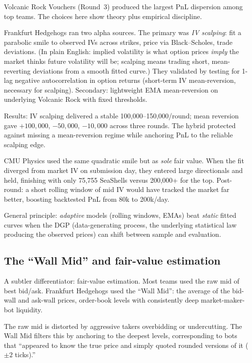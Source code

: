 Volcanic Rock Vouchers (Round~3) produced the largest PnL
dispersion among top teams.  The choices here show theory plus
empirical discipline.

Frankfurt Hedgehogs ran two alpha sources.  The primary was \emph{IV
scalping}: fit a parabolic smile to observed IVs across strikes,
price via Black--Scholes, trade deviations.  (In plain English:
implied volatility is what option prices \emph{imply} the market
thinks future volatility will be; scalping means trading short,
mean-reverting deviations from a smooth fitted curve.)  They validated by
testing for 1-lag negative autocorrelation in option returns
(short-term IV mean-reversion, necessary for scalping).
Secondary: lightweight EMA mean-reversion on underlying Volcanic
Rock with fixed thresholds.

Results: IV scalping delivered a stable 100{,}000--150{,}000/round;
mean reversion gave $+100{,}000$, $-50{,}000$, $-10{,}000$ across
three rounds.  The hybrid protected against missing a
mean-reversion regime while anchoring PnL to the reliable
scalping edge.

CMU Physics used the same quadratic smile but as \emph{sole} fair
value.  When the fit diverged from market IV on submission day,
they entered large directionals and held, finishing with only
75{,}755 SeaShells versus 200{,}000+ for the top.  Post-round: a short
rolling window of mid IV would have tracked the market far better,
boosting backtested PnL from 80k to 200k/day.

General principle: \emph{adaptive} models (rolling windows, EMAs)
beat \emph{static} fitted curves when the DGP (data-generating
process, the underlying statistical law producing the observed
prices) can shift between sample and evaluation.

\subsection{The ``Wall Mid'' and fair-value estimation}
\label{sec:top_wall_mid}

A subtler differentiator: fair-value estimation.  Most teams used
the raw mid of best bid/ask.  Frankfurt Hedgehogs used the
``Wall Mid'': the average of the bid-wall and ask-wall prices,
order-book levels with consistently deep market-maker-bot
liquidity.

The raw mid is distorted by aggressive takers overbidding or
undercutting.  The Wall Mid filters this by anchoring to the
deepest levels, corresponding to bots that ``appeared to know the
true price and simply quoted rounded versions of it ($\pm 2$
ticks).''

